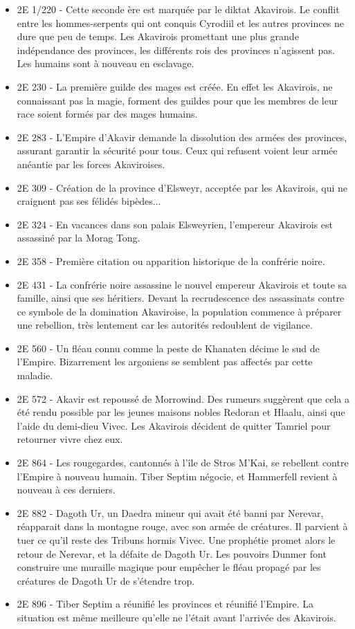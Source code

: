 \begin{itemize}
\setlength{\leftmargin}{35pt}
\setlength{\itemsep}{20pt}
\item
2E 1/220 - Cette seconde ère est marquée par le diktat Akavirois. Le conflit entre les hommes-serpents qui ont conquis Cyrodiil et les autres provinces ne dure que peu de temps. Les Akavirois promettant une plus grande indépendance des provinces, les différents rois des provinces n'agissent pas. Les humains sont à nouveau en esclavage.
\item
2E 230 - La première guilde des mages est créée. En effet les Akavirois, ne connaissant pas la magie, forment des guildes pour que les membres de leur race soient formés par des mages humains.
\item
2E 283 - L'Empire d'Akavir demande la dissolution des armées des provinces, assurant garantir la sécurité pour tous. Ceux qui refusent voient leur armée anéantie par les forces Akaviroises.
\item
2E 309 - Création de la province d'Elsweyr, acceptée par les Akavirois, qui ne craignent pas ses félidés bipèdes...
\item
2E 324 - En vacances dans son palais Elsweyrien, l'empereur Akavirois est assassiné par la Morag Tong.
\item
2E 358 - Première citation ou apparition historique de la confrérie noire.
\item
2E 431 - La confrérie noire assassine le nouvel empereur Akavirois et toute sa famille, ainsi que ses héritiers. Devant la recrudescence des assassinats contre ce symbole de la domination Akaviroise, la population commence à préparer une rebellion, très lentement car les autorités redoublent de vigilance.
\item
2E 560 - Un fléau connu comme la peste de Khanaten décime le sud de l'Empire. Bizarrement les argoniens se semblent pas affectés par cette maladie.
\item
2E 572 - Akavir est repoussé de Morrowind. Des rumeurs suggèrent que cela a été rendu possible par les jeunes maisons nobles Redoran et Hlaalu, ainsi que l'aide du demi-dieu Vivec. Les Akavirois décident de quitter Tamriel pour retourner vivre chez eux.
\item
2E 864 - Les rougegardes, cantonnés à l'île de Stros M'Kai, se rebellent contre l'Empire à nouveau humain. Tiber Septim négocie, et Hammerfell revient à nouveau à ces derniers.
\item
2E 882 - Dagoth Ur, un Daedra mineur qui avait été banni par Nerevar, réapparait dans la montagne rouge, avec son armée de créatures. Il parvient à tuer ce qu'il reste des Tribuns hormis Vivec. Une prophétie promet alors le retour de Nerevar, et la défaite de Dagoth Ur. Les pouvoirs Dunmer font construire une muraille magique pour empêcher le fléau propagé par les créatures de Dagoth Ur de s'étendre trop.
\item
2E 896 - Tiber Septim a réunifié les provinces et réunifié l'Empire. La situation est même meilleure qu'elle ne l'était avant l'arrivée des Akavirois.
\end{itemize}

